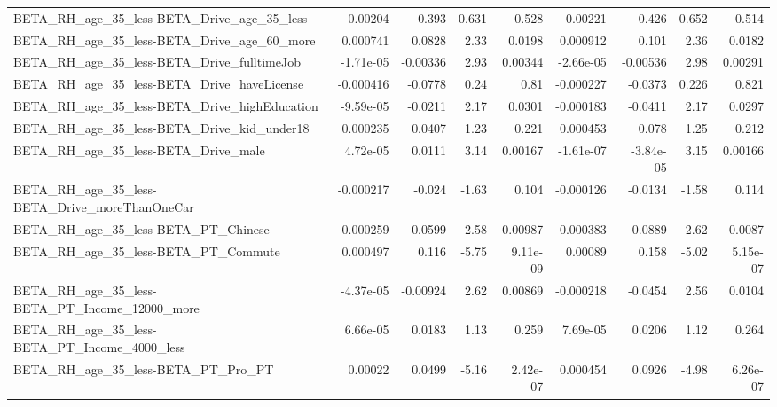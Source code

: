 \begin{tabular}{lrrrrrrrr}
BETA\_RH\_age\_35\_less-BETA\_Drive\_age\_35\_less         &     0.00204 &        0.393 &     0.631 &    0.528 &    0.00221 &       0.426 &        0.652 &         0.514 \\
BETA\_RH\_age\_35\_less-BETA\_Drive\_age\_60\_more         &    0.000741 &       0.0828 &      2.33 &   0.0198 &   0.000912 &       0.101 &         2.36 &        0.0182 \\
BETA\_RH\_age\_35\_less-BETA\_Drive\_fulltimeJob         &   -1.71e-05 &     -0.00336 &      2.93 &  0.00344 &  -2.66e-05 &    -0.00536 &         2.98 &       0.00291 \\
BETA\_RH\_age\_35\_less-BETA\_Drive\_haveLicense         &   -0.000416 &      -0.0778 &      0.24 &     0.81 &  -0.000227 &     -0.0373 &        0.226 &         0.821 \\
BETA\_RH\_age\_35\_less-BETA\_Drive\_highEducation       &   -9.59e-05 &      -0.0211 &      2.17 &   0.0301 &  -0.000183 &     -0.0411 &         2.17 &        0.0297 \\
BETA\_RH\_age\_35\_less-BETA\_Drive\_kid\_under18         &    0.000235 &       0.0407 &      1.23 &    0.221 &   0.000453 &       0.078 &         1.25 &         0.212 \\
BETA\_RH\_age\_35\_less-BETA\_Drive\_male                &    4.72e-05 &       0.0111 &      3.14 &  0.00167 &  -1.61e-07 &   -3.84e-05 &         3.15 &       0.00166 \\
BETA\_RH\_age\_35\_less-BETA\_Drive\_moreThanOneCar      &   -0.000217 &       -0.024 &     -1.63 &    0.104 &  -0.000126 &     -0.0134 &        -1.58 &         0.114 \\
BETA\_RH\_age\_35\_less-BETA\_PT\_Chinese                &    0.000259 &       0.0599 &      2.58 &  0.00987 &   0.000383 &      0.0889 &         2.62 &        0.0087 \\
BETA\_RH\_age\_35\_less-BETA\_PT\_Commute                &    0.000497 &        0.116 &     -5.75 & 9.11e-09 &    0.00089 &       0.158 &        -5.02 &      5.15e-07 \\
BETA\_RH\_age\_35\_less-BETA\_PT\_Income\_12000\_more      &   -4.37e-05 &     -0.00924 &      2.62 &  0.00869 &  -0.000218 &     -0.0454 &         2.56 &        0.0104 \\
BETA\_RH\_age\_35\_less-BETA\_PT\_Income\_4000\_less       &    6.66e-05 &       0.0183 &      1.13 &    0.259 &   7.69e-05 &      0.0206 &         1.12 &         0.264 \\
BETA\_RH\_age\_35\_less-BETA\_PT\_Pro\_PT                 &     0.00022 &       0.0499 &     -5.16 & 2.42e-07 &   0.000454 &      0.0926 &        -4.98 &      6.26e-07 \\

\end{tabular}
